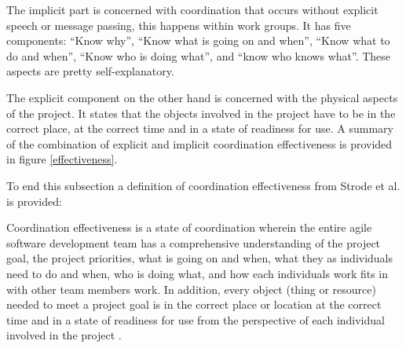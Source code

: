 The implicit part is concerned with coordination that occurs without explicit speech or message passing, this happens within work groups. It has five components: ``Know why'', ``Know what is going on and when'', ``Know what to do and when'', ``Know who is doing what'', and ``know who knows what''. These aspects are pretty self-explanatory.

The explicit component on the other hand is concerned with the physical aspects of the project. It states that the objects involved in the project have to be in the correct place, at the correct time and in a state of readiness for use. A summary of the combination of explicit and implicit coordination effectiveness is provided in figure \ref{effectiveness}.

To end this subsection a definition of coordination effectiveness from Strode et al. is provided:

\begin{fancyquotes}
Coordination effectiveness is a state of coordination wherein the entire agile software development team has a comprehensive understanding of the project goal, the project priorities, what is going on and when, what they as individuals need to do and when, who is doing what, and how each individuals work fits in with other team members work. In addition, every object (thing or resource) needed to meet a project goal is in the correct place or location at the correct time and in a state of readiness for use from the perspective of each individual involved in the project \cite{Strode2011}.
\end{fancyquotes}

